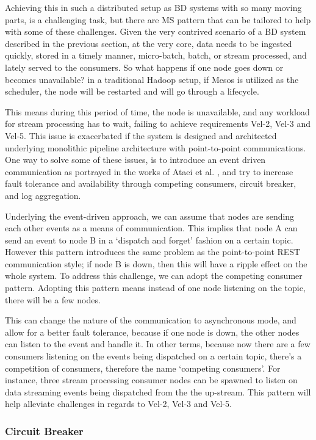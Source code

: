 \documentclass{bmcart}
\begin{document}
Achieving this in such a distributed setup as BD systems with so many moving parts, is a challenging task, but there are MS pattern that can be tailored to help with some of these challenges. Given the very contrived scenario of a BD system described in the previous section, at the very core, data needs to be ingested quickly, stored in a timely manner, micro-batch, batch, or stream processed, and lately served to the consumers. So what happens if one node goes down or becomes unavailable? in a traditional Hadoop setup, if Mesos is utilized as the scheduler, the node will be restarted and will go through a lifecycle. 

This means during this period of time, the node is unavailable, and any workload for stream processing has to wait, failing to achieve requirements Vel-2, Vel-3 and Vel-5. This issue is exacerbated if the system is designed and architected underlying monolithic pipeline architecture with point-to-point communications. One way to solve some of these issues, is to introduce an event driven communication as portrayed in the works of Ataei et al. \cite{ataei2021neomycelia}, and try to increase fault tolerance and availability through competing consumers, circuit breaker, and log aggregation. 

Underlying the event-driven approach, we can assume that nodes are sending each other events as a means of communication. This implies that node A can send an event to node B in a `dispatch and forget' fashion on a certain topic. However this pattern introduces the same problem as the point-to-point REST communication style; if node B is down, then this will have a ripple effect on the whole system. To address this challenge, we can adopt the competing consumer pattern. Adopting this pattern means instead of one node listening on the topic, there will be a few nodes. 

This can change the nature of the communication to asynchronous mode, and allow for a better fault tolerance, because if one node is down, the other nodes can listen to the event and handle it. In other terms, because now there are a few consumers listening on the events being dispatched on a certain topic, there's a competition of consumers, therefore the name `competing consumers'. For instance, three stream processing consumer nodes can be spawned to listen on data streaming events being dispatched from the the up-stream. This pattern will help alleviate challenges in regards to Vel-2, Vel-3 and Vel-5.

\subsubsection{Circuit Breaker}
\end{document}
